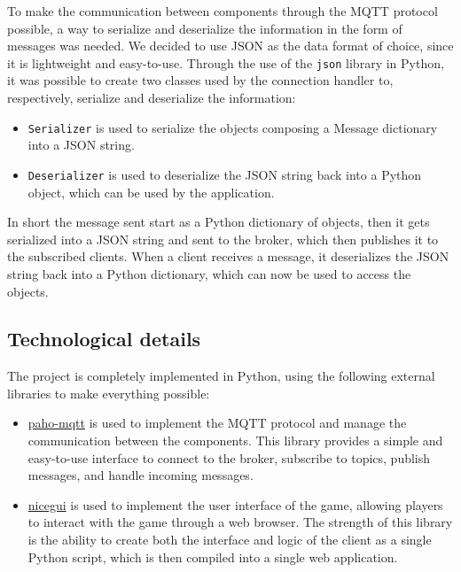 \documentclass{scrartcl}
\begin{document}
To make the communication between components through the MQTT protocol possible, a way to serialize
and deserialize the information in the form of messages was needed.
We decided to use JSON as the data format of choice, since it is lightweight and easy-to-use.
Through the use of the \texttt{json} library in Python, it was possible to create two classes used
by the connection handler to, respectively, serialize and deserialize the information:
\begin{itemize}
      \item \texttt{Serializer} is used to serialize the objects composing a Message dictionary into a 
            JSON string.
      \item \texttt{Deserializer} is used to deserialize the JSON string back into a Python
            object, which can be used by the application.
\end{itemize}
In short the message sent start as a Python dictionary of objects, then it gets serialized into a 
JSON string and sent to the broker, which then publishes it to the subscribed clients.
When a client receives a message, it deserializes the JSON string back into a Python dictionary, 
which can now be used to access the objects.

\subsection{Technological details}\label{technological-details}

The project is completely implemented in Python, using the following external libraries to make everything
possible:
\begin{itemize}
      \item \href{https://pypi.org/project/paho-mqtt/}{paho-mqtt} is used to implement the MQTT 
            protocol and manage the communication between the components. This library provides a 
            simple and easy-to-use interface to connect to the broker, subscribe to topics, publish 
            messages, and handle incoming messages.
      \item \href{https://nicegui.io/}{nicegui} is used to implement the user interface of the game, 
            allowing players to interact with the game through a web browser. The strength of this 
            library is the ability to create both the interface and logic of the client as a single 
            Python script, which is then compiled into a single web application.
\end{itemize}
\end{document}
